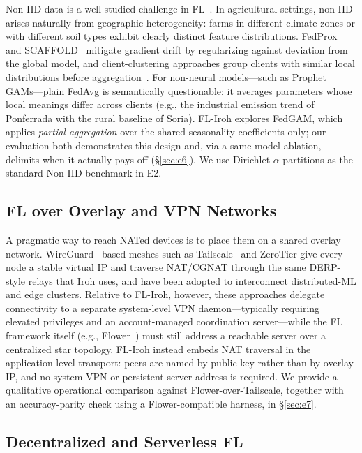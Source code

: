 ﻿\documentclass[journal]{IEEEtran}
\begin{document}
Non-IID data is a well-studied challenge in FL~\cite{zhao2018noniid,li2022noniid,kairouz2021}. In agricultural settings, non-IID arises naturally from geographic heterogeneity: farms in different climate zones or with different soil types exhibit clearly distinct feature distributions. FedProx~\cite{fedprox2020} and SCAFFOLD~\cite{scaffold2020} mitigate gradient drift by regularizing against deviation from the global model, and client-clustering approaches group clients with similar local distributions before aggregation~\cite{briggs2020cluster}. For non-neural models---such as Prophet GAMs---plain FedAvg is semantically questionable: it averages parameters whose local meanings differ across clients (e.g., the industrial emission trend of Ponferrada with the rural baseline of Soria). FL-Iroh explores FedGAM, which applies \emph{partial aggregation} over the shared seasonality coefficients only; our evaluation both demonstrates this design and, via a same-model ablation, delimits when it actually pays off (\S\ref{sec:e6}). We use Dirichlet $\alpha$ partitions as the standard Non-IID benchmark in E2.

\subsection{FL over Overlay and VPN Networks}

A pragmatic way to reach NATed devices is to place them on a shared overlay network. WireGuard~\cite{wireguard2017}-based meshes such as Tailscale~\cite{tailscale2023} and ZeroTier give every node a stable virtual IP and traverse NAT/CGNAT through the same DERP-style relays that Iroh uses, and have been adopted to interconnect distributed-ML and edge clusters. Relative to FL-Iroh, however, these approaches delegate connectivity to a separate system-level VPN daemon---typically requiring elevated privileges and an account-managed coordination server---while the FL framework itself (e.g., Flower~\cite{flower2022}) must still address a reachable server over a centralized star topology. FL-Iroh instead embeds NAT traversal in the application-level transport: peers are named by public key rather than by overlay IP, and no system VPN or persistent server address is required. We provide a qualitative operational comparison against Flower-over-Tailscale, together with an accuracy-parity check using a Flower-compatible harness, in \S\ref{sec:e7}.

\subsection{Decentralized and Serverless FL}
\end{document}
